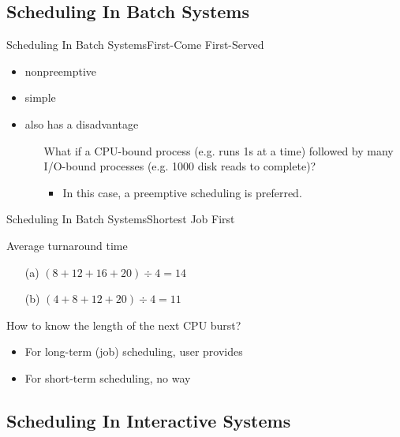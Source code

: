 \subsection{Scheduling In Batch Systems}
\label{sec:sched-batch-syst}

\begin{frame}{Scheduling In Batch Systems}{First-Come First-Served}
  \begin{itemize}
  \item nonpreemptive
  \item simple
  \item also has a disadvantage
    \begin{itemize}
    \item[] What if a CPU-bound process (e.g. runs 1s at a time) followed by many I/O-bound
      processes (e.g. 1000 disk reads to complete)?
      \begin{itemize}
      \item In this case, a preemptive scheduling is preferred.
      \end{itemize}
    \end{itemize}
  \end{itemize}
\end{frame}

\begin{frame}{Scheduling In Batch Systems}{Shortest Job First}
  \begin{center}
     
  \end{center}
  \begin{block}{Average turnaround time}
    \begin{itemize}
    \item[(a)] $(8+12+16+20)\div{}4=14$
    \item[(b)] $(4+8+12+20)\div{}4=11$
    \end{itemize}
  \end{block}
  How to know the length of the next CPU burst?
  \begin{itemize}
  \item For long-term (job) scheduling, user provides
  \item For short-term scheduling, no way
  \end{itemize}
\end{frame}

\subsection{Scheduling In Interactive Systems}
\label{sec:sched-inter-syst}

